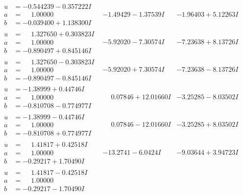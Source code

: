 \documentclass[1p]{elsarticle_modified}
\theoremstyle{definition}
\begin{document}
$$\begin{array}{c|c|c}
\begin{aligned}
u &= -0.544239 - 0.357222 I \\
a &= \phantom{-}1.00000\phantom{ +0.000000I} \\
b &= -0.039400 + 1.138300 I\end{aligned}
 & -1.49429 - 1.37539 I & -1.96403 + 5.12263 I \\ \hline\begin{aligned}
u &= \phantom{-}1.327650 + 0.303823 I \\
a &= \phantom{-}1.00000\phantom{ +0.000000I} \\
b &= -0.890497 + 0.845146 I\end{aligned}
 & -5.92020 - 7.30574 I & -7.23638 + 8.13726 I \\ \hline\begin{aligned}
u &= \phantom{-}1.327650 - 0.303823 I \\
a &= \phantom{-}1.00000\phantom{ +0.000000I} \\
b &= -0.890497 - 0.845146 I\end{aligned}
 & -5.92020 + 7.30574 I & -7.23638 - 8.13726 I \\ \hline\begin{aligned}
u &= -1.38999 + 0.44746 I \\
a &= \phantom{-}1.00000\phantom{ +0.000000I} \\
b &= -0.810708 - 0.774977 I\end{aligned}
 & \phantom{-}0.07846 + 12.01660 I & -3.25285 - 8.03502 I \\ \hline\begin{aligned}
u &= -1.38999 - 0.44746 I \\
a &= \phantom{-}1.00000\phantom{ +0.000000I} \\
b &= -0.810708 + 0.774977 I\end{aligned}
 & \phantom{-}0.07846 - 12.01660 I & -3.25285 + 8.03502 I \\ \hline\begin{aligned}
u &= \phantom{-}1.41817 + 0.42518 I \\
a &= \phantom{-}1.00000\phantom{ +0.000000I} \\
b &= -0.29217 + 1.70490 I\end{aligned}
 & -13.2741 - 6.0424 I & -9.03644 + 3.94723 I \\ \hline\begin{aligned}
u &= \phantom{-}1.41817 - 0.42518 I \\
a &= \phantom{-}1.00000\phantom{ +0.000000I} \\
b &= -0.29217 - 1.70490 I\end{aligned}

\end{array}$$
\end{document}
